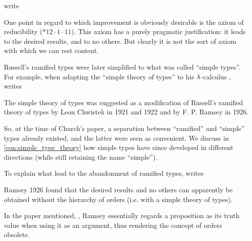\begin{remark}\label{rem:unramified_theory_of_types}
   write
  \begin{displayquote}
    One point in regard to which improvement is obviously desirable is the axiom of reducibility (\( {\ast} 12 {\cdot} 1 {\cdot} 11 \)). This axiom has a purely pragmatic justification: it leads to the desired results, and to no others. But clearly it is not the sort of axiom with which we can rest content.
  \end{displayquote}

  Russell's ramified types were later simplified to what was called \enquote{simple types}. For example, when adapting the \enquote{simple theory of types} to his \( {\mathrm \lambda} \)-calculus , writes
  \begin{displayquote}
    The simple theory of types was suggested as a modification of Russell's ramified theory of types by Leon Chwistek in 1921 and 1922 and by F. P. Ramsey in 1926.
  \end{displayquote}

  So, at the time of Church's paper, a separation between \enquote{ramified} and \enquote{simple} types already existed, and the latter were seen as convenient. We discuss in \cref{con:simple_type_theory} how simple types have since developed in different directions (while still retaining the name \enquote{simple}).

  To explain what lead to the abandonment of ramified types,  writes
  \begin{displayquote}
    Ramsey 1926 found that the desired results and no others can apparently be obtained without the hierarchy of orders (i.e. with a simple theory of types).
  \end{displayquote}

  In the paper mentioned, \cite{Ramsey1926Foundations}, Ramsey essentially regards a proposition as its truth value when using it as an argument, thus rendering the concept of orders obsolete.
\end{remark}

